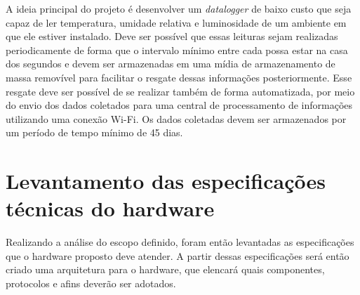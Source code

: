 
A ideia principal do projeto é desenvolver um \textit{datalogger} de baixo custo que seja capaz de ler temperatura, umidade relativa e luminosidade de um ambiente em que ele estiver instalado. Deve ser possível que essas leituras sejam realizadas periodicamente de forma que o intervalo mínimo entre cada possa estar na casa dos segundos e devem ser armazenadas em uma mídia de armazenamento de massa removível para facilitar o resgate dessas informações posteriormente. Esse resgate deve ser possível de se realizar também de forma automatizada, por meio do envio dos dados coletados para uma central de processamento de informações utilizando uma conexão Wi-Fi. Os dados coletadas devem ser armazenados por um período de tempo mínimo de 45 dias. 



\section{Levantamento das especificações técnicas do hardware}

Realizando a análise do escopo definido, foram então levantadas as especificações que o hardware proposto deve atender. A partir dessas especificações será então criado uma arquitetura para o hardware, que elencará quais componentes, protocolos e afins deverão ser adotados.


